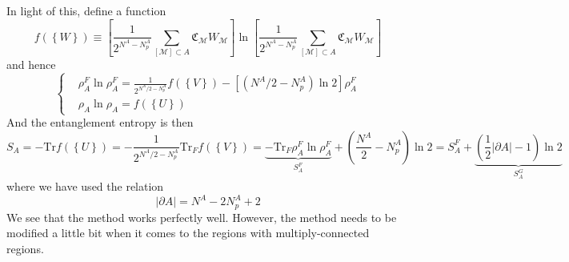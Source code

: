 \documentclass[12font]{article}
\newcommand{\lr}[1]{\left(  #1  \right)}
\newcommand{\lrm}[1]{\left[  #1  \right]}
\newcommand{\lrg}[1]{\left\{  #1  \right\}}
\newcommand{\abs}[1]{\left|  #1  \right|}
\newcommand{\de}{\partial}
\newcommand{\mrm}[1]{\mathrm{#1}}
\newcommand{\Tr}{\mrm{Tr}}
\begin{document}
In light of this, define a function
\[
f(\lrg{W}) \equiv \lrm{\frac{1}{2^{N^A-N^A_p}}\sum_{[\mathcal{M}]\subset A}\mathfrak{C}_\mathcal{M}W_{\mathcal{M}}}\ln\lrm{\frac{1}{2^{N^A-N^A_p}}\sum_{[\mathcal{M}]\subset A}\mathfrak{C}_\mathcal{M}W_{\mathcal{M}}}
\]
and hence
\[
\left\{
\begin{aligned}
&\rho^F_A\ln\rho_A^F = \frac{1}{2^{N^A/2-N^A_p}} f\lr{\lrg{V}} - \lrm{\lr{N^A/2-N^A_p}\ln 2}\rho^F_A \\
& \rho_A\ln\rho_A = f\lr{\lrg{U}}
\end{aligned}
\right.
\]
And the entanglement entropy is then
\begin{equation}\label{equ.simple_result}
    S_A = -\Tr f(\lrg{U}) = -\frac{1}{2^{N^A/2 - N^A_p}}\Tr_F f(\lrg{V}) = \underbrace{-\Tr_F \rho^F_A\ln\rho^F_A}_{S^F_A} + \lr{\frac{N^A}{2}-N^A_p}\ln 2 = S^F_A + \underbrace{\lr{\frac{1}{2}\abs{\de A}-1}\ln 2}_{S^G_A}
\end{equation}
where we have used the relation
\begin{equation}\label{equ.Pick}
    \abs{\de A} = N^A - 2N^A_p + 2
\end{equation}
We see that the method works perfectly well. However, the method needs to be modified a little bit when it comes to the regions with multiply-connected regions.
\end{document}
